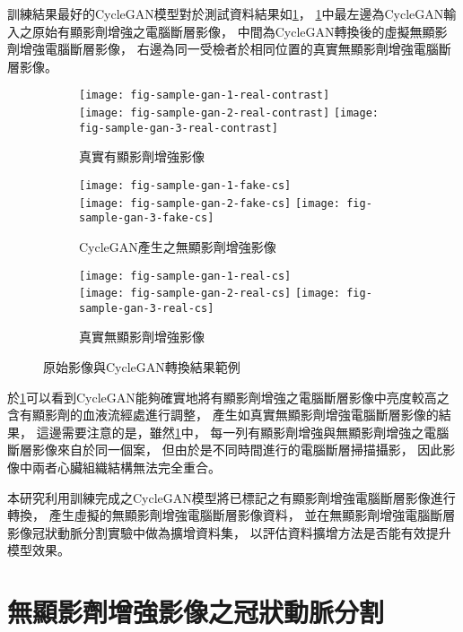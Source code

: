 \documentclass[class=NCU_thesis, crop=false]{standalone}
\begin{document}
訓練結果最好的CycleGAN模型對於測試資料結果如\cref{fig:fig-sample-gan}，
\cref{fig:fig-sample-gan}中最左邊為CycleGAN輸入之原始有顯影劑增強之電腦斷層影像，
中間為CycleGAN轉換後的虛擬無顯影劑增強電腦斷層影像，
右邊為同一受檢者於相同位置的真實無顯影劑增強電腦斷層影像。
\begin{figure}[!ht]
    \centering
    \begin{subfigure}{0.3\textwidth}
        \caption*{真實有顯影劑增強影像}
    \texttt{[image: fig-sample-gan-1-real-contrast]}\\[3pt]
    \texttt{[image: fig-sample-gan-2-real-contrast]}
    \texttt{[image: fig-sample-gan-3-real-contrast]}
    \end{subfigure}
    \hfil
    \begin{subfigure}{0.3\linewidth}
        \caption*{CycleGAN產生之無顯影劑增強影像}
    \texttt{[image: fig-sample-gan-1-fake-cs]}\\[3pt]
    \texttt{[image: fig-sample-gan-2-fake-cs]}
    \texttt{[image: fig-sample-gan-3-fake-cs]}
    \end{subfigure}
    \hfil
    \begin{subfigure}{0.3\linewidth}
        \caption*{真實無顯影劑增強影像}
    \texttt{[image: fig-sample-gan-1-real-cs]}\\[3pt]
    \texttt{[image: fig-sample-gan-2-real-cs]}
    \texttt{[image: fig-sample-gan-3-real-cs]}
    \end{subfigure}
        \caption{原始影像與CycleGAN轉換結果範例}
    \label{fig:fig-sample-gan}
\end{figure}

於\cref{fig:fig-sample-gan}可以看到CycleGAN能夠確實地將有顯影劑增強之電腦斷層影像中亮度較高之含有顯影劑的血液流經處進行調整，
產生如真實無顯影劑增強電腦斷層影像的結果，
這邊需要注意的是，雖然\cref{fig:fig-sample-gan}中，
每一列有顯影劑增強與無顯影劑增強之電腦斷層影像來自於同一個案，
但由於是不同時間進行的電腦斷層掃描攝影，
因此影像中兩者心臟組織結構無法完全重合。

本研究利用訓練完成之CycleGAN模型將已標記之有顯影劑增強電腦斷層影像進行轉換，
產生虛擬的無顯影劑增強電腦斷層影像資料，
並在無顯影劑增強電腦斷層影像冠狀動脈分割實驗中做為擴增資料集，
以評估資料擴增方法是否能有效提升模型效果。

\section{無顯影劑增強影像之冠狀動脈分割}
\end{document}
